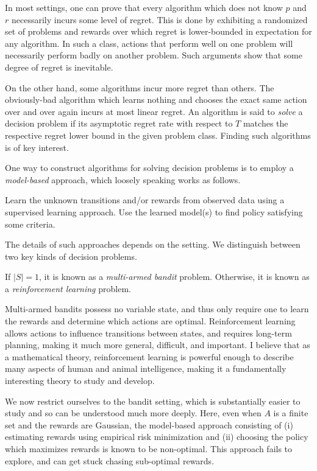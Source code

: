 \documentclass[11pt]{book}
\begin{document}
In most settings, one can prove that every algorithm which does not know $p$ and $r$ necessarily incurs some level of regret.
This is done by exhibiting a randomized set of problems and rewards over which regret is lower-bounded in expectation for any algorithm.
In such a class, actions that perform well on one problem will necessarily perform badly on another problem.
Such arguments show that some degree of regret is inevitable.

On the other hand, some algorithms incur more regret than others.
The obviously-bad algorithm which learns nothing and chooses the exact same action over and over again incurs at most linear regret.
An algorithm is said to \emph{solve} a decision problem if its asymptotic regret rate with respect to $T$ matches the respective regret lower bound in the given problem class.
Finding such algorithms is of key interest.

One way to construct algorithms for solving decision problems is to employ a \emph{model-based} approach, which loosely speaking works as follows.

\1 Learn the unknown transitions and/or rewards from observed data using a supervised learning approach.
\2 Use the learned model(s) to find policy satisfying some criteria.
\0 

The details of such approaches depends on the setting.
We distinguish between two key kinds of decision problems.

\1 If $|S| = 1$, it is known as a \emph{multi-armed bandit} problem.
\2 Otherwise, it is known as a \emph{reinforcement learning} problem.
\0 

Multi-armed bandits possess no variable state, and thus only require one to learn the rewards and determine which actions are optimal.
Reinforcement learning allows actions to influence transitions between states, and requires long-term planning, making it much more general, difficult, and important.
I believe that as a mathematical theory, reinforcement learning is powerful enough to describe many aspects of human and animal intelligence, making it a fundamentally interesting theory to study and develop.

We now restrict ourselves to the bandit setting, which is substantially easier to study and so can be understood much more deeply.
Here, even when $A$ is a finite set and the rewards are Gaussian, the model-based approach consisting of (i) estimating rewards using empirical risk minimization and (ii) choosing the policy which maximizes rewards is known to be non-optimal.
This approach fails to explore, and can get stuck chasing sub-optimal rewards.
\end{document}
